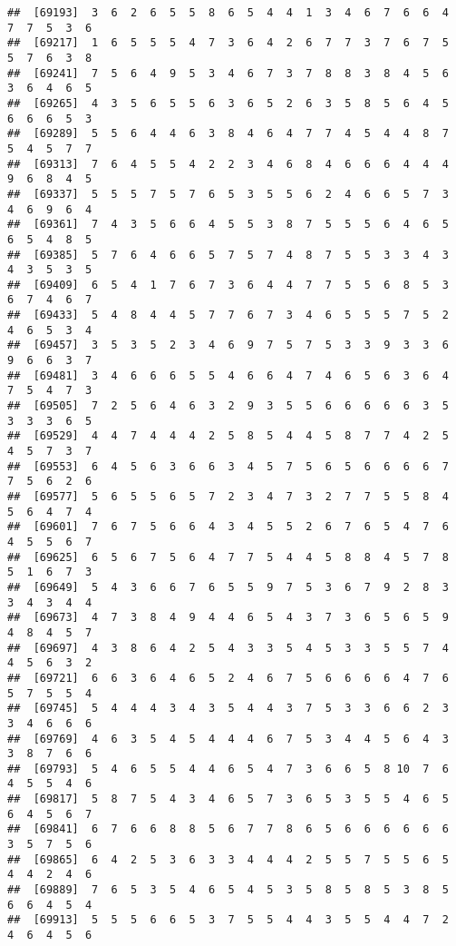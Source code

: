 \documentclass[
]{book}
\begin{document}
\begin{verbatim}
##  [69193]  3  6  2  6  5  5  8  6  5  4  4  1  3  4  6  7  6  6  4  7  7  5  3  6
##  [69217]  1  6  5  5  5  4  7  3  6  4  2  6  7  7  3  7  6  7  5  5  7  6  3  8
##  [69241]  7  5  6  4  9  5  3  4  6  7  3  7  8  8  3  8  4  5  6  3  6  4  6  5
##  [69265]  4  3  5  6  5  5  6  3  6  5  2  6  3  5  8  5  6  4  5  6  6  6  5  3
##  [69289]  5  5  6  4  4  6  3  8  4  6  4  7  7  4  5  4  4  8  7  5  4  5  7  7
##  [69313]  7  6  4  5  5  4  2  2  3  4  6  8  4  6  6  6  4  4  4  9  6  8  4  5
##  [69337]  5  5  5  7  5  7  6  5  3  5  5  6  2  4  6  6  5  7  3  4  6  9  6  4
##  [69361]  7  4  3  5  6  6  4  5  5  3  8  7  5  5  5  6  4  6  5  6  5  4  8  5
##  [69385]  5  7  6  4  6  6  5  7  5  7  4  8  7  5  5  3  3  4  3  4  3  5  3  5
##  [69409]  6  5  4  1  7  6  7  3  6  4  4  7  7  5  5  6  8  5  3  6  7  4  6  7
##  [69433]  5  4  8  4  4  5  7  7  6  7  3  4  6  5  5  5  7  5  2  4  6  5  3  4
##  [69457]  3  5  3  5  2  3  4  6  9  7  5  7  5  3  3  9  3  3  6  9  6  6  3  7
##  [69481]  3  4  6  6  6  5  5  4  6  6  4  7  4  6  5  6  3  6  4  7  5  4  7  3
##  [69505]  7  2  5  6  4  6  3  2  9  3  5  5  6  6  6  6  6  3  5  3  3  3  6  5
##  [69529]  4  4  7  4  4  4  2  5  8  5  4  4  5  8  7  7  4  2  5  4  5  7  3  7
##  [69553]  6  4  5  6  3  6  6  3  4  5  7  5  6  5  6  6  6  6  7  7  5  6  2  6
##  [69577]  5  6  5  5  6  5  7  2  3  4  7  3  2  7  7  5  5  8  4  5  6  4  7  4
##  [69601]  7  6  7  5  6  6  4  3  4  5  5  2  6  7  6  5  4  7  6  4  5  5  6  7
##  [69625]  6  5  6  7  5  6  4  7  7  5  4  4  5  8  8  4  5  7  8  5  1  6  7  3
##  [69649]  5  4  3  6  6  7  6  5  5  9  7  5  3  6  7  9  2  8  3  3  4  3  4  4
##  [69673]  4  7  3  8  4  9  4  4  6  5  4  3  7  3  6  5  6  5  9  4  8  4  5  7
##  [69697]  4  3  8  6  4  2  5  4  3  3  5  4  5  3  3  5  5  7  4  4  5  6  3  2
##  [69721]  6  6  3  6  4  6  5  2  4  6  7  5  6  6  6  6  4  7  6  5  7  5  5  4
##  [69745]  5  4  4  4  3  4  3  5  4  4  3  7  5  3  3  6  6  2  3  3  4  6  6  6
##  [69769]  4  6  3  5  4  5  4  4  4  6  7  5  3  4  4  5  6  4  3  3  8  7  6  6
##  [69793]  5  4  6  5  5  4  4  6  5  4  7  3  6  6  5  8 10  7  6  4  5  5  4  6
##  [69817]  5  8  7  5  4  3  4  6  5  7  3  6  5  3  5  5  4  6  5  6  4  5  6  7
##  [69841]  6  7  6  6  8  8  5  6  7  7  8  6  5  6  6  6  6  6  6  3  5  7  5  6
##  [69865]  6  4  2  5  3  6  3  3  4  4  4  2  5  5  7  5  5  6  5  4  4  2  4  6
##  [69889]  7  6  5  3  5  4  6  5  4  5  3  5  8  5  8  5  3  8  5  6  6  4  5  4
##  [69913]  5  5  5  6  6  5  3  7  5  5  4  4  3  5  5  4  4  7  2  4  6  4  5  6

\end{verbatim}
\end{document}
